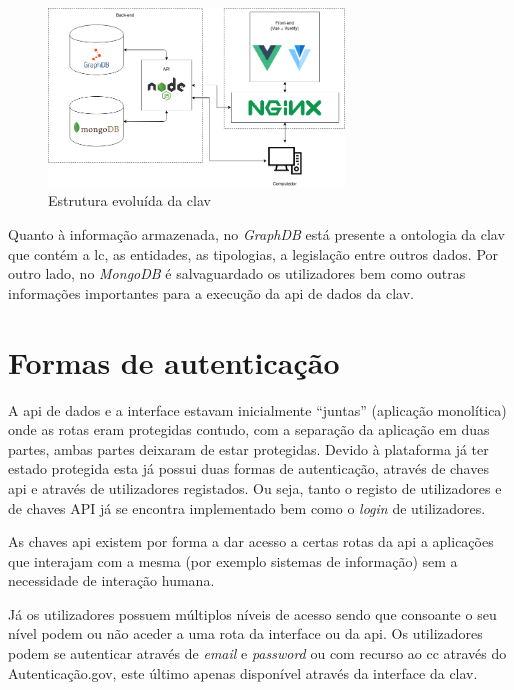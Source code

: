 \begin{figure}[H]
    \begin{center}
        \includegraphics[width=0.7\textwidth]{img/clav_struct2.png}
    \end{center}
    \caption{Estrutura evoluída da \acrshort{clav}}\label{fig:clav_struct2}
\end{figure}

Quanto à informação armazenada, no \textit{GraphDB} está presente a ontologia da \acrshort{clav} que contém a \acrshort{lc}, as entidades, as tipologias, a legislação entre outros dados. Por outro lado, no \textit{MongoDB} é salvaguardado os utilizadores bem como outras informações importantes para a execução da \acrshort{api} de dados da \acrshort{clav}.

\section{Formas de autenticação}\label{sec:autenticacao}
A \acrshort{api} de dados e a interface estavam inicialmente ``juntas'' (aplicação monolítica) onde as rotas eram protegidas contudo, com a separação da aplicação em duas partes, ambas partes deixaram de estar protegidas. Devido à plataforma já ter estado protegida esta já possui duas formas de autenticação, através de chaves \acrshort{api} e através de utilizadores registados. Ou seja, tanto o registo de utilizadores e de chaves API já se encontra implementado bem como o \textit{login} de utilizadores.

As chaves \acrshort{api} existem por forma a dar acesso a certas rotas da \acrshort{api} a aplicações que interajam com a mesma (por exemplo sistemas de informação) sem a necessidade de interação humana.

Já os utilizadores possuem múltiplos níveis de acesso sendo que consoante o seu nível podem ou não aceder a uma rota da interface ou da \acrshort{api}. Os utilizadores podem se autenticar através de \textit{email} e \textit{password} ou com recurso ao \acrfull{cc} através do Autenticação.gov, este último apenas disponível através da interface da \acrshort{clav}.

